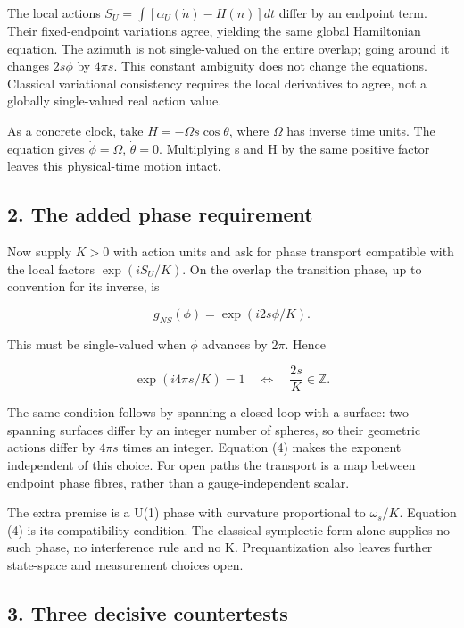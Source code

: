 \documentclass[11pt,a4paper]{article}
\begin{document}
The local actions \(S_U=\int[\alpha_U(\dot n)-H(n)]dt\) differ by an
endpoint term. Their fixed-endpoint variations agree, yielding the same
global Hamiltonian equation. The azimuth is not single-valued on the
entire overlap; going around it changes \(2s\phi\) by \(4\pi s\). This
constant ambiguity does not change the equations. Classical variational
consistency requires the local derivatives to agree, not a globally
single-valued real action value.

As a concrete clock, take \(H=-\Omega s\cos\theta\), where \(\Omega\)
has inverse time units. The equation gives \(\dot\phi=\Omega\),
\(\dot\theta=0\). Multiplying s and H by the same positive factor leaves
this physical-time motion intact.

\hypertarget{the-added-phase-requirement}{%
\subsection{2. The added phase
requirement}\label{the-added-phase-requirement}}

Now supply \(K>0\) with action units and ask for phase transport
compatible with the local factors \(\exp(iS_U/K)\). On the overlap the
transition phase, up to convention for its inverse, is

\[g_{NS}(\phi)=\exp(i2s\phi/K).\]

This must be single-valued when \(\phi\) advances by \(2\pi\). Hence

\[\exp(i4\pi s/K)=1
\quad\Longleftrightarrow\quad \frac{2s}{K}\in\mathbb Z. \tag{4}\]

The same condition follows by spanning a closed loop with a surface: two
spanning surfaces differ by an integer number of spheres, so their
geometric actions differ by \(4\pi s\) times an integer. Equation (4)
makes the exponent independent of this choice. For open paths the
transport is a map between endpoint phase fibres, rather than a
gauge-independent scalar.

The extra premise is a U(1) phase with curvature proportional to
\(\omega_s/K\). Equation (4) is its compatibility condition. The
classical symplectic form alone supplies no such phase, no interference
rule and no K. Prequantization also leaves further state-space and
measurement choices open.

\hypertarget{three-decisive-countertests}{%
\subsection{3. Three decisive
countertests}\label{three-decisive-countertests}}
\end{document}
